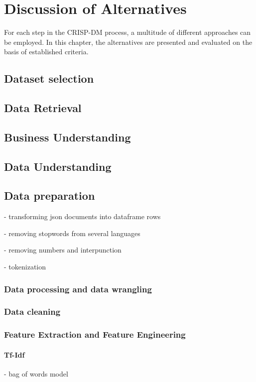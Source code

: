 \chapter{Discussion of Alternatives}

For each step in the \ac{CRISP-DM} process, a multitude of different approaches can be employed. In this chapter, the alternatives are presented and evaluated on the basis of established criteria.

\section{Dataset selection}

\section{Data Retrieval}

\section{Business Understanding}

\section{Data Understanding}

\section{Data preparation}
- transforming json documents into dataframe rows

- removing stopwords from several languages

- removing numbers and interpunction

- tokenization

	\subsection{Data processing and data wrangling}
	
	
	\subsection{Data cleaning}
	
	\subsection{Feature Extraction and Feature Engineering}
		\subsubsection{Tf-Idf}
		- bag of words model

